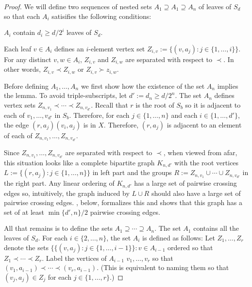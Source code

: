 \documentclass[kpfonts]{patmorin}
\begin{document}
\begin{proof}
    We will define two sequences of nested sets $A_1\supseteq A_1\supseteq A_{n}$ of leaves of $S_d$ so that each $A_i$ satisifies the following conditions:
    \begin{compactenum}[(C1)]
        \item $A_i$ contain $d_i\ge d/2^i$ leaves of $S_d$.
        \item Each leaf $v\in A_i$ defines an $i$-element vertex set $Z_{i,v}:=\{(v,a_j):j\in\{1,\ldots,i\}\}$.  For any distinct $v,w\in A_i$, $Z_{i,v}$ and $Z_{i,w}$ are separated with respect to $\prec$.  In other words, $Z_{i,v}\prec Z_{i,w}$ or $Z_{i,v}\succ z_{i,w}$.
    \end{compactenum}

    Before defining $A_1,\ldots,A_n$ we first show how the existence of the set $A_n$ implies the lemma.  To avoid triple-subscripts, let $d':=d_n\ge d/2^n$.   The set $A_n$ defines vertex sets $Z_{n,v_1}\prec\cdots\prec Z_{n,v_{d'}}$.  Recall that $r$ is the root of $S_b$ so it is adjacent to each of $v_{1},\ldots,v_{d'}$ in $S_b$.  Therefore, for each $j\in\{1,\ldots,n\}$ and each $i\in\{1,\ldots,d'\}$, the edge $(r,a_j)(v_i,a_j)$ is in $X$. Therefore, $(r,a_j)$ is adjacent to an element of each of $Z_{n,v_1},\ldots,Z_{n,v_{d'}}$.

    Since $Z_{n,v_1},\ldots,Z_{n,v_{d'}}$ are separated with respect to $\prec$, when viewed from afar, this situation looks like a complete bipartite graph $K_{n,d'}$ with the root vertices $L:=\{(r,a_j):j\in\{1,\ldots,n\}\}$ in left part and the groups $R:=Z_{n,v_1}\cup\cdots\cup Z_{n,v_{d'}}$ in the right part.  Any linear ordering of $K_{n,d'}$ has a large set of pairwise crossing edges so, intuitively, the graph induced by $L\cup R$ should also have a large set of pairwise crossing edges. , below, formalizes this and shows that this graph has a set of at least $\min\{d',n\}/2$ pairwise crossing edges.

    All that remains is to define the sets $A_1\supseteq\cdots\supseteq A_n$.  The set $A_1$ contains all the leaves of $S_d$.  For each $i\in\{2,\ldots,n\}$, the set $A_i$ is defined as follows:  Let $Z_1,\ldots,Z_r$ denote the sets $\{\{(v,a_j):j\in\{1,\ldots,i-1\}\}:v\in A_{i-1}$ ordered so that $Z_1\prec\cdots\prec Z_r$. Label the vertices of $A_{i-1}$ $v_1,\ldots,v_r$ so that $(v_1,a_{i-1})\prec\cdots\prec (v_r,a_{i-1})$. (This is equivalent to naming them so that $(v_j,a_j)\in Z_j$ for each $j\in\{1,\ldots,r\}$.)


\end{proof}
\end{document}
